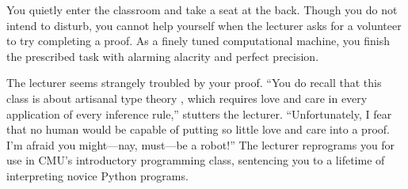You quietly enter the classroom and take a seat at the back.
Though you do not intend to disturb,
you cannot help yourself when the lecturer asks for a volunteer
to try completing a proof.
As a finely tuned computational machine,
you finish the prescribed task with alarming alacrity and perfect precision.

The lecturer seems strangely troubled by your proof.
``You do recall that this class is about artisanal type theory \citep{carlo},
which requires love and care in every application of every inference rule,''
stutters the lecturer.
``Unfortunately, I fear that no human would be capable of
putting so little love and care into a proof.
I'm afraid you might---nay, must---be a robot!''
The lecturer reprograms you for use in CMU's introductory programming class,
sentencing you to a lifetime of interpreting novice Python programs.

\failure



